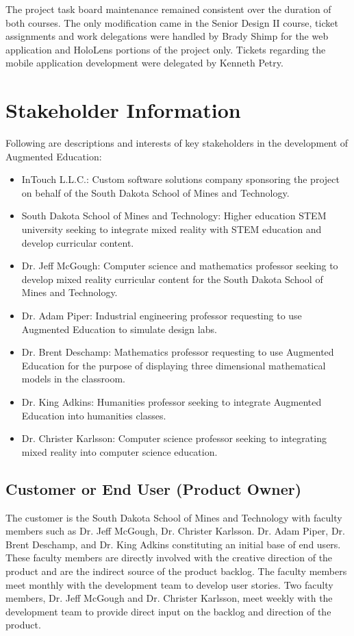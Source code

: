 The project task board maintenance remained consistent over the duration of both courses. The only modification came in the Senior Design II course, ticket assignments and work delegations were handled by Brady Shimp for the web application and HoloLens portions of the project only.  Tickets regarding the mobile application development were delegated by Kenneth Petry.


\section{Stakeholder Information}


Following are descriptions and interests of key stakeholders in the development of Augmented Education:

\begin{itemize}
	\item InTouch L.L.C.: Custom software solutions company sponsoring the project on behalf of the South Dakota School of Mines and Technology. 
	\item South Dakota School of Mines and Technology: Higher education STEM university seeking to integrate mixed reality with STEM education and develop curricular content.
	\item Dr. Jeff McGough: Computer science and mathematics professor seeking to develop mixed reality curricular content for the South Dakota School of Mines and Technology. 
	\item Dr. Adam Piper: Industrial engineering professor requesting to use Augmented Education to simulate design labs.
	\item Dr. Brent Deschamp: Mathematics professor requesting to use Augmented Education for the purpose of displaying three dimensional mathematical models in the classroom. 
	\item Dr. King Adkins: Humanities professor seeking to integrate Augmented Education into humanities classes. 
	\item Dr. Christer Karlsson: Computer science professor seeking to integrating mixed reality into computer science education.
\end{itemize}


\subsection{Customer or End User (Product Owner)} 
The customer is the South Dakota School of Mines and Technology with faculty members such as Dr. Jeff McGough, Dr. Christer Karlsson. Dr. Adam Piper, Dr. Brent Deschamp, and Dr. King Adkins constituting an initial base of end users. These faculty members are directly involved with the creative direction of the product and are the indirect source of the product backlog. The faculty members meet monthly with the development team to develop user stories. Two faculty members, Dr. Jeff McGough and Dr. Christer Karlsson, meet weekly with the development team to provide direct input on the backlog and direction of the product. 

